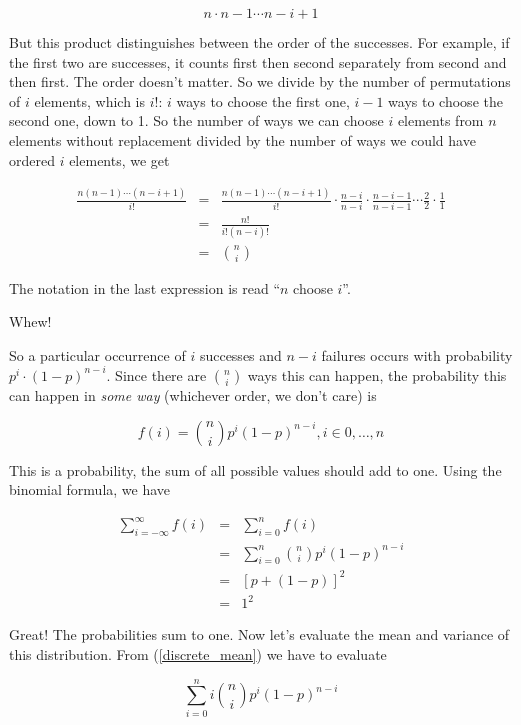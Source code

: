 \documentclass[]{article}
\begin{document}
$$
n \cdot n-1 \cdots n-i+1
$$

But this product distinguishes between the order of the successes.
For example, if the first two are successes, it counts first then
second separately from second and then first.  The order doesn't
matter.  So we divide by the number of permutations of $i$ elements,
which is $i!$: $i$ ways to choose the first one, $i-1$ ways to
choose the second one, down to 1.  So the number of ways we
can choose $i$ elements from $n$ elements without replacement
divided by the number of ways we could have ordered $i$ elements,
we get 

\begin{eqnarray*}
\frac{n(n-1) \cdots (n-i+1)}{i!} & = & \frac{n(n-1) \cdots (n-i+1)}{i!} \cdot
         \frac{n-i}{n-i} \cdot \frac{n-i-1}{n-i-1} \cdots 
         \frac{2}{2} \cdot \frac{1}{1} \\
      & = & \frac{n!}{i! (n-i)!} \\
      & = & {n \choose i}
\end{eqnarray*}

The notation in the last expression is read ``$n$ choose $i$''.

Whew!

So a particular occurrence of $i$ successes and $n-i$
failures occurs with probability $p^i \cdot (1-p)^{n-i}$.
Since there are ${n \choose i}$ ways this can happen, the
probability this can happen in \emph{some way} 
(whichever order, we don't care) is

\begin{equation} \label{binomial_density}
f(i) = {n \choose i} p^i (1-p)^{n-i}, i \in 0, \ldots, n
\end{equation}

This is a probability, the sum of all possible values
should add to one.  Using the binomial formula, we have

\begin{eqnarray*}
\sum_{i=-\infty}^{\infty} f(i) & = & \sum_{i=0}^{n} f(i) \\
   & = & \sum_{i=0}^{n} {n \choose i} p^i (1-p)^{n-i}  \\
   & = & [ p + (1-p) ]^2 \\
   & = & 1^2
\end{eqnarray*}

Great! The probabilities sum to one.  Now let's evaluate
the mean and variance of this distribution.  From
(\ref{discrete_mean}) we have to evaluate

$$
\sum_{i=0}^n i {n \choose i} p^i (1-p)^{n-i}
$$
\end{document}
